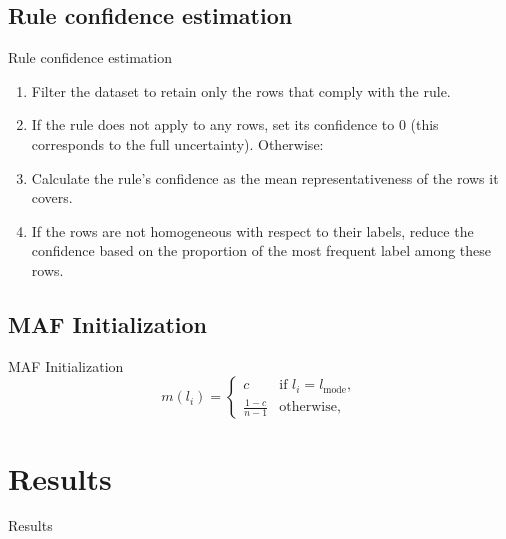\documentclass[aspectratio=169]{beamer}
\begin{document}
\subsection{Rule confidence estimation}
\begin{frame}{Rule confidence estimation}
\begin{enumerate}
    \item Filter the dataset to retain only the rows that comply with the rule. \pause
    \item If the rule does not apply to any rows, set its confidence to 0 (this corresponds to the full uncertainty). Otherwise: \pause
    \item Calculate the rule's confidence as the mean representativeness of the rows it covers. \pause
    \item If the rows are not homogeneous with respect to their labels, reduce the confidence based on the proportion of the most frequent label among these rows.
\end{enumerate} 
\end{frame}

\subsection{MAF Initialization}
\begin{frame}{MAF Initialization}
\[
m(l_i) = 
\begin{cases} 
c & \text{if } l_i = l_{\text{mode}}, \\
\frac{1-c}{n-1} & \text{otherwise},
\end{cases}
\]
\end{frame}

\section{Results}

\begin{frame}
    \begin{center}
        \Huge Results
    \end{center}
\end{frame}
\end{document}
